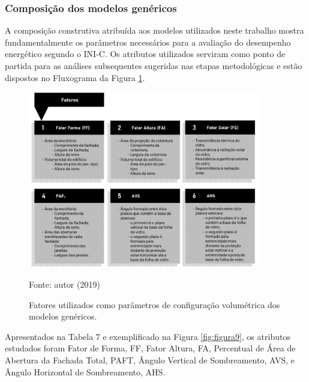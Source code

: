 \subsubsection{Composição dos modelos genéricos}
A composição construtiva atribuída aos modelos utilizados neste trabalho mostra fundamentalmente os parâmetros necessários para a avaliação do desempenho energético segundo o INI-C. Os atributos utilizados serviram como ponto de partida para as análises subsequentes sugeridas nas etapas metodológicas e estão dispostos no Fluxograma da Figura \ref{fig:figura8}.\vspace{-0.10cm}%
    \begin{figure}[H]
        \centering
        \caption{Fatores utilizados como parâmetros de configuração volumétrica dos modelos genéricos.}
        \includegraphics[width=0.9\textwidth]{figures/fig10_Fluxogramas-2.jpg}
        \begin{flushleft}
            \par \small Fonte: autor (2019)
        \end{flushleft}
        \label{fig:figura8}
    \end{figure}
\noindent Apresentados na Tabela 7 e exemplificado na Figura \ref{fig:figura9}, os atributos estudados foram Fator de Forma, FF, Fator Altura, FA, Percentual de Área de Abertura da Fachada Total, PAFT, Ângulo Vertical de Sombreamento, AVS, e Ângulo Horizontal de Sombreamento, AHS.%
